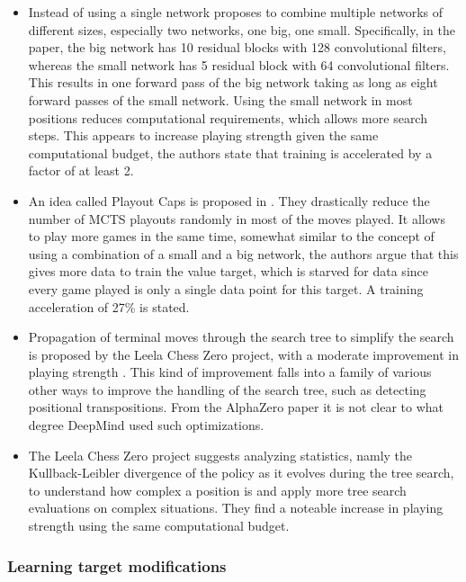 \documentclass[12pt,onecolumn,oneside,titlepage]{article}
\begin{document}
\begin{itemize}
 \item Instead of using a single network \cite{lan2019multiple} proposes to combine multiple networks of different sizes, especially two networks, one big, one small. Specifically, in the paper, the 
 big network has 10 residual blocks with 128 convolutional filters, whereas the small network has 5 residual block with 64 convolutional filters. This results in one forward pass of the big network taking as long as eight forward passes of the small network.
 Using the small network in most positions reduces computational requirements, 
 which allows more search steps. This appears to increase playing strength given the same computational budget, the authors state that training is accelerated by a factor of at least 2.
 \item An idea called Playout Caps is proposed in \cite{wu2019accelerating}. They drastically reduce the number of MCTS playouts randomly in most of the moves played. It allows to play more games in the same time, somewhat similar to 
 the concept of using a combination of a small and a big network, the authors argue that this gives more data to train the value target, which is starved for data since every game played is only a single data point for this target. A training acceleration of 27\% is stated.
 \item Propagation of terminal moves through the search tree to simplify the search is proposed by the Leela Chess Zero project, with a moderate improvement in playing strength \cite{leela0propagation}. This kind of improvement falls
 into a family of various other ways to improve the handling of the search tree, such as detecting positional transpositions. From the AlphaZero paper it is not clear to what degree DeepMind used such optimizations.
 \item The Leela Chess Zero project suggests analyzing statistics, namly the Kullback-Leibler divergence of the policy as it evolves during the tree search, to understand how complex a position is and apply more tree search evaluations on complex situations. They find a noteable increase
   in playing strength \cite{leela0kldgain} using the same computational budget.
\end{itemize}

\subsubsection{Learning target modifications}
\end{document}

